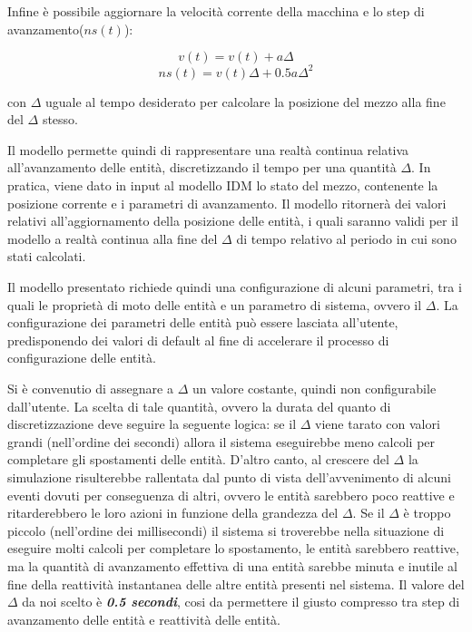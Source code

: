 
Infine è possibile aggiornare la velocità corrente della macchina e lo step di
avanzamento($ns(t)$): 

\begin{equation}
v(t)= v(t)+a\Delta
\end{equation}
\begin{equation}
ns(t)= v(t)\Delta+0.5a\Delta^2
\end{equation}

con $\Delta$ uguale al tempo desiderato per calcolare la posizione del mezzo
alla fine del $\Delta$ stesso. 

Il modello permette quindi di rappresentare una realtà continua relativa
all'avanzamento delle entità, discretizzando il tempo per una quantità $\Delta$.
In pratica, viene dato in input al modello \ac{IDM} lo stato del mezzo,
contenente la posizione corrente e i parametri di avanzamento.
Il modello ritornerà dei valori relativi all'aggiornamento della posizione delle
entità, i quali saranno validi per il modello a realtà continua alla fine
del $\Delta$ di tempo relativo al periodo in cui sono stati calcolati.

Il modello presentato richiede quindi una configurazione di alcuni parametri,
tra i quali le proprietà di moto delle entità e un parametro di sistema, ovvero
il $\Delta$. La configurazione dei parametri delle entità può essere lasciata
all'utente, predisponendo dei valori di default al fine di accelerare il
processo di configurazione delle entità.

Si è convenutio di assegnare a $\Delta$ un valore costante, quindi non
configurabile dall'utente. La scelta di tale quantità, ovvero la durata
del quanto di discretizzazione deve seguire la seguente logica:
se il $\Delta$ viene tarato con valori grandi (nell'ordine dei secondi) allora
il sistema eseguirebbe meno calcoli per completare gli spostamenti delle entità.
D'altro canto, al crescere del $\Delta$ la simulazione risulterebbe rallentata
dal punto di vista dell'avvenimento di alcuni eventi dovuti per conseguenza di
altri, ovvero le entità sarebbero poco reattive e ritarderebbero le loro azioni
in funzione della grandezza del $\Delta$. Se il $\Delta$ è troppo piccolo
(nell'ordine dei millisecondi) il sistema si troverebbe nella situazione di
eseguire molti calcoli per completare lo spostamento, le entità sarebbero
reattive, ma la quantità di avanzamento effettiva di una entità sarebbe minuta e
inutile al fine della reattività instantanea delle altre entità presenti nel
sistema. Il valore del $\Delta$ da noi scelto è \textbf{\textit{0.5 secondi}},
cosi da permettere il giusto compresso tra step di avanzamento delle entità e
reattività delle entità.